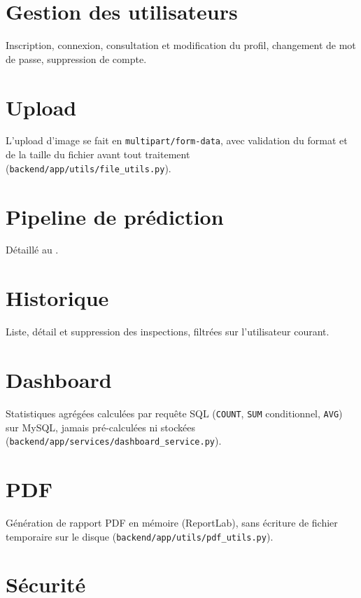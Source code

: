 \section{Gestion des utilisateurs}

Inscription, connexion, consultation et modification du profil, changement de mot de passe, suppression de compte.

\section{Upload}

L'upload d'image se fait en \texttt{multipart/form-data}, avec validation du format et de la taille du fichier avant tout traitement (\texttt{backend/app/utils/file\_utils.py}).

\section{Pipeline de pr\'ediction}

D\'etaill\'e au .

\section{Historique}

Liste, d\'etail et suppression des inspections, filtr\'ees sur l'utilisateur courant.

\section{Dashboard}

Statistiques agr\'eg\'ees calcul\'ees par requ\^ete SQL (\texttt{COUNT}, \texttt{SUM} conditionnel, \texttt{AVG}) sur MySQL, jamais pr\'e-calcul\'ees ni stock\'ees (\texttt{backend/app/services/dashboard\_service.py}).

\section{PDF}

G\'en\'eration de rapport PDF en m\'emoire (ReportLab), sans \'ecriture de fichier temporaire sur le disque (\texttt{backend/app/utils/pdf\_utils.py}).

\section{S\'ecurit\'e}

